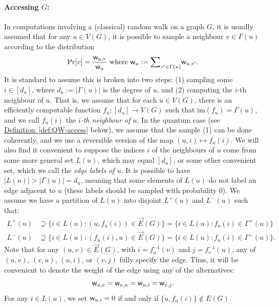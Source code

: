 \documentclass{article}
\newcommand{\defin}[1]{\hyperref[def:#1]{Definition~\ref*{def:#1}}}
\renewcommand{\>}{\rangle}
\newcommand{\<}{\langle}
\renewcommand{\(}{\left(}
\renewcommand{\)}{\right)}
\def\w{{\sf w}}
\begin{document}
\paragraph{Accessing $G$:} In computations involving a (classical) random walk on a graph $G$, it is usually assumed that for any $u\in V(G)$, it is possible to sample a neighbour $v\in\Gamma(u)$ according to the distribution 
$$\Pr[v] = \frac{\w_{u,v}}{\w_u}\mbox{ where }\w_u:=\textstyle{\displaystyle\sum}_{ v'\in\Gamma(u)}\w_{u,v'}.$$
It is standard to assume this is broken into two steps: (1) sampling some $i\in [d_u]$, where $d_u:=|\Gamma(u)|$ is the degree of $u$, and (2) computing the $i$-th neighbour of $u$. That is, we assume that for each $u\in V(G)$, there is an efficiently computable function $f_u:[d_u]\rightarrow V(G)$ such that $\mathrm{im}(f_u)=\Gamma(u)$, and we call $f_u(i)$ the \emph{$i$-th neighbour of $u$}. In the quantum case (see \defin{QW-access} below), we assume that the sample (1) can be done coherently, and we use a reversible version of the map $(u,i)\mapsto f_u(i)$. We will also find it convenient to suppose the indices $i$ of the neighbours of $u$ come from some more general set $L(u)$, which may equal $[d_u]$, or some other convenient set, which we call the \emph{edge labels of $u$}. It is possible to have $|L(u)|>|\Gamma(u)|=d_u$, meaning that some elements of $L(u)$ do not label an edge adjacent to $u$ (these labels should be sampled with probability 0). 
We assume we have a partition of $L(u)$ into disjoint $L^+(u)$ and $L^-(u)$ such that:
\begin{equation*}
\begin{split}
L^+(u) &\supseteq \{i\in L(u): (u,f_u(i))\in\overrightarrow{E}(G)\} = \{i\in L(u):f_u(i)\in \Gamma^+(u)\}\\
L^-(u) &\supseteq \{i\in L(u): (f_u(i),u)\in\overrightarrow{E}(G)\} = \{i\in L(u):f_u(i)\in \Gamma^-(u)\}.
\end{split}
\end{equation*}
Note that for any $(u,v)\in\overrightarrow{E}(G)$, with $i=f_u^{-1}(v)$ and $j=f_v^{-1}(u)$, any of $(u,v)$, $(v,u)$, $(u,i)$, or $(v,j)$ fully specify the edge. Thus, it will be convenient to denote the weight of the edge using any of the alternatives:
$$\w_{u,v}=\w_{v,u}=\w_{u,i}=\w_{v,j}.$$
For any $i\in L(u)$, we set $\w_{u,i}=0$ if and only if $\{u,f_u(i)\}\not\in E(G)$.
\end{document}
